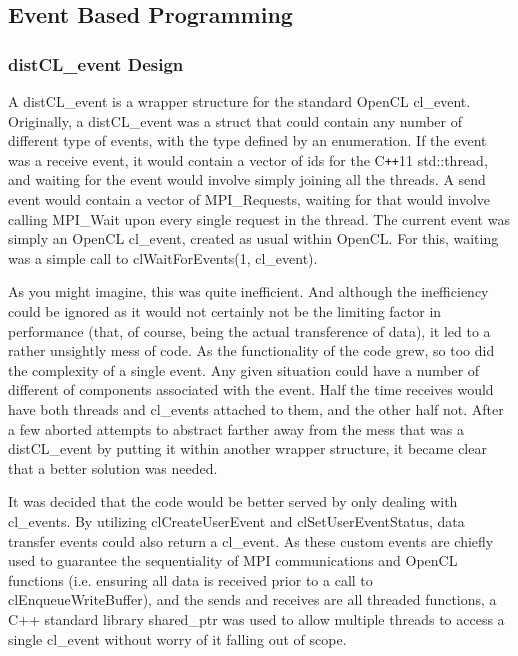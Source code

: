\documentclass[report.tex]{subfiles}
\begin{document}
\subsection{Event Based Programming} %
\label{sub:event_based_programming}


    \subsubsection{distCL\_event Design} %
    \label{ssub:distcl_event_design}
        A distCL\_event is a wrapper structure for the standard OpenCL cl\_event. Originally, a distCL\_event was a struct that could contain any number of different type of events, with the type defined by an enumeration. If the event was a receive event, it would contain a vector of ids for the C\texttt{++}11 std::thread, and waiting for the event would involve simply joining all the threads. A send event would contain a vector of MPI\_Requests, waiting for that would involve calling MPI\_Wait upon every single request in the thread. The current event was simply an OpenCL cl\_event, created as usual within OpenCL. For this, waiting was a simple call to clWaitForEvents(1, cl\_event). 

        As you might imagine, this was quite inefficient. And although the inefficiency could be ignored as it would not certainly not be the limiting factor in performance (that, of course, being the actual transference of data), it led to a rather unsightly mess of code. As the functionality of the code grew, so too did the complexity of a single event. Any given situation could have a number of different of components associated with the event. Half the time receives would have both threads and cl\_events attached to them, and the other half not. After a few aborted attempts to abstract farther away from the mess that was a distCL\_event by putting it within another wrapper structure, it became clear that a better solution was needed.

        It was decided that the code would be better served by only dealing with cl\_events. By utilizing clCreateUserEvent and clSetUserEventStatus, data transfer events could also return a cl\_event. As these custom events are chiefly used to guarantee the sequentiality of MPI communications and OpenCL functions (i.e. ensuring all data is received prior to a call to clEnqueueWriteBuffer), and the sends and receives are all threaded functions, a C++ standard library shared\_ptr was used to allow multiple threads to access a single cl\_event without worry of it falling out of scope.
\end{document}
